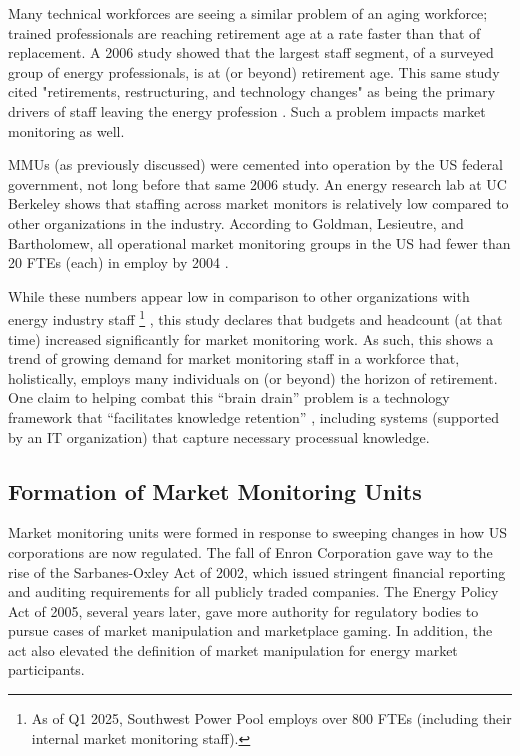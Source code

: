 Many technical workforces are seeing a similar problem of an aging workforce; trained professionals are reaching retirement age at a rate faster than that of replacement. A 2006 study showed that the largest staff segment, of a surveyed group of energy professionals, is at (or beyond) retirement age. This same study cited "retirements, restructuring, and technology changes" as being the primary drivers of staff leaving the energy profession \cite{raysnyder}. Such a problem impacts market monitoring as well.

MMUs (as previously discussed) were cemented into operation by the US federal government, not long before that same 2006 study. An energy research lab at UC Berkeley shows that staffing across market monitors is relatively low compared to other organizations in the industry. According to Goldman, Lesieutre, and Bartholomew, all operational market monitoring groups in the US had fewer than 20 FTEs (each) in employ by 2004 \cite{goldman}.

While these numbers appear low in comparison to other organizations with energy industry staff \footnote{As of Q1 2025, Southwest Power Pool employs over 800 FTEs (including their internal market monitoring staff).}
, this study declares that budgets and headcount (at that time) increased significantly for market monitoring work. As such, this shows a trend of growing demand for market monitoring staff in a workforce that, holistically, employs many individuals on (or beyond) the horizon of retirement. One claim to helping combat this “brain drain” problem is a technology framework that “facilitates knowledge retention” \cite{raysnyder}, including systems (supported by an IT organization) that capture necessary processual knowledge.

\subsection{Formation of Market Monitoring Units}

Market monitoring units were formed in response to sweeping changes in how US corporations are now regulated. The fall of Enron Corporation gave way to the rise of the Sarbanes-Oxley Act of 2002, which issued stringent financial reporting and auditing requirements for all publicly traded companies. The Energy Policy Act of 2005, several years later, gave more authority for regulatory bodies to pursue cases of market manipulation and marketplace gaming. In addition, the act also elevated the definition of market manipulation for energy market participants.

